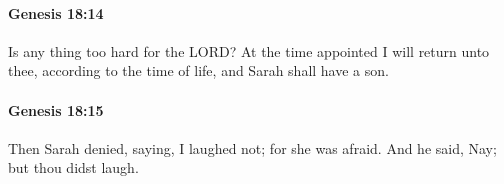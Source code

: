 		\paragraph{Genesis 18:14} %
			\label{GENESIS-18-14}

			Is any thing too hard for the LORD? At the time appointed I will return unto thee, according to the time of life, and Sarah shall have a son.


		\paragraph{Genesis 18:15} %
			\label{GENESIS-18-15}

			Then Sarah denied, saying, I laughed not; for she was afraid. And he said, Nay; but thou didst laugh.


